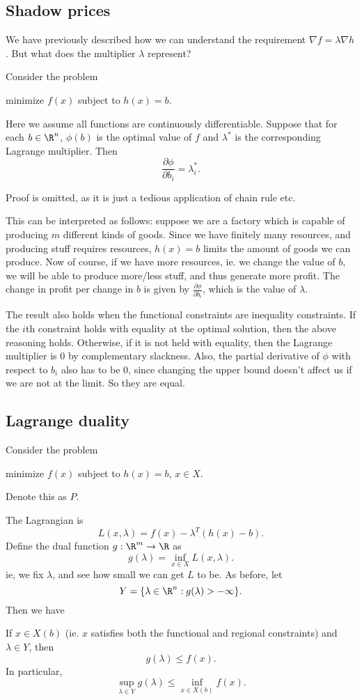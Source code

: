 \documentclass[a4paper]{article}
\begin{document}
\subsection{Shadow prices}
We have previously described how we can understand the requirement $\nabla f = \lambda \nabla h$. But what does the multiplier $\lambda$ represent?
\begin{thm}[]
  Consider the problem
  \begin{center}
    minimize $f(x)$ subject to $h(x) = b$.
  \end{center}
  Here we assume all functions are continuously differentiable. Suppose that for each $b\in \R^n$, $\phi(b)$ is the optimal value of $f$ and $\lambda^*$ is the corresponding Lagrange multiplier. Then
  \[
    \frac{\partial \phi}{\partial b_i} = \lambda_i^*.
  \]
\end{thm}
Proof is omitted, as it is just a tedious application of chain rule etc.

This can be interpreted as follows: suppose we are a factory which is capable of producing $m$ different kinds of goods. Since we have finitely many resources, and producing stuff requires resources, $h(x) = b$ limits the amount of goods we can produce. Now of course, if we have more resources, ie. we change the value of $b$, we will be able to produce more/less stuff, and thus generate more profit. The change in profit per change in $b$ is given by $\frac{\partial \phi}{\partial b_i}$, which is the value of $\lambda$.

The result also holds when the functional constraints are inequality constraints. If the $i$th constraint holds with equality at the optimal solution, then the above reasoning holds. Otherwise, if it is not held with equality, then the Lagrange multiplier is $0$ by complementary slackness. Also, the partial derivative of $\phi$ with respect to $b_i$ also has to be $0$, since changing the upper bound doesn't affect us if we are not at the limit. So they are equal.
\subsection{Lagrange duality}
Consider the problem
\begin{center}
  minimize $f(x)$ subject to $h(x) = b$, $x\in X$.
\end{center}
Denote this as $P$.

The Lagrangian is
\[
  L(x, \lambda) = f(x) - \lambda^T (h(x) - b).
\]
Define the dual function $g: \R^m \to \R$ as
\[
  g(\lambda) = \inf_{x\in X}L(x, \lambda).
\]
ie, we fix $\lambda$, and see how small we can get $L$ to be. As before, let
\[
  Y = \{\lambda\in \R^n: g(\lambda) > -\infty\}.
\]
Then we have
\begin{thm}
  If $x\in X(b)$ (ie. $x$ satisfies both the functional and regional constraints) and $\lambda \in Y$, then
  \[
    g(\lambda) \leq f(x).
  \]
  In particular,
  \[
    \sup_{\lambda\in Y}g(\lambda) \leq \inf_{x\in X(b)}f(x).
  \]
\end{thm}
\end{document}
